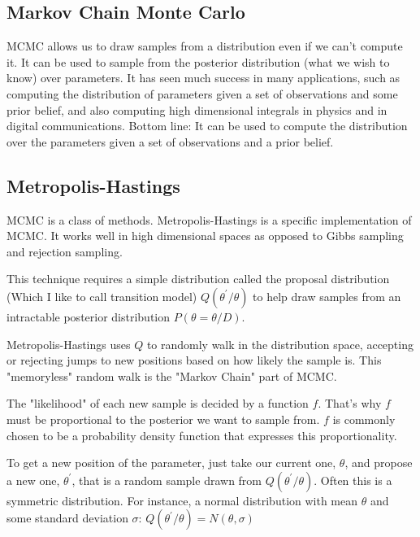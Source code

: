 \subsection{Markov Chain Monte Carlo}
MCMC allows us to draw samples from a distribution even if we can't compute it. It can be used to sample from the posterior distribution (what we wish to know) over parameters. It has seen much success in many applications, such as computing the distribution of parameters given a set of observations and some prior belief, and also computing high dimensional integrals in physics and in digital communications.
Bottom line: It can be used to compute the distribution over the parameters given a set of observations and a prior belief.

\subsection{Metropolis-Hastings}
MCMC is a class of methods. Metropolis-Hastings is a specific implementation of MCMC. It works well in high dimensional spaces as opposed to Gibbs sampling and rejection sampling.

This technique requires a simple distribution called the proposal distribution (Which I like to call transition model) $Q(\theta^\prime/\theta)$ to help draw samples from an intractable posterior distribution $P(\theta =\theta/D)$.

Metropolis-Hastings uses $Q$ to randomly walk in the distribution space, accepting or rejecting jumps to new positions based on how likely the sample is. This "memoryless" random walk is the "Markov Chain" part of MCMC.

The "likelihood" of each new sample is decided by a function $f$. That's why $f$ must be proportional to the posterior we want to sample from. $f$ is commonly chosen to be a probability density function that expresses this proportionality.

To get a new position of the parameter, just take our current one, $\theta$, and propose a new one, $\theta^\prime$, that is a random sample drawn from $Q(\theta^\prime/\theta)$. Often this is a symmetric distribution. For instance, a normal distribution with mean $\theta$ and some standard deviation $\sigma$: $Q(\theta^\prime/\theta) = N(\theta, \sigma)$

